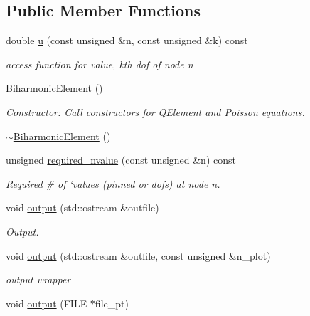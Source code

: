 \subsection*{Public Member Functions}
\begin{DoxyCompactItemize}
\item 
double \hyperlink{classoomph_1_1BiharmonicElement_ada3127693270368783121dfbef92d35d}{u} (const unsigned \&n, const unsigned \&k) const
\begin{DoxyCompactList}\small\item\em access function for value, kth dof of node n \end{DoxyCompactList}\item 
\hyperlink{classoomph_1_1BiharmonicElement_ae7ea696a05373fc4105a99bf4a8e49d7}{Biharmonic\+Element} ()
\begin{DoxyCompactList}\small\item\em Constructor\+: Call constructors for \hyperlink{classoomph_1_1QElement}{Q\+Element} and Poisson equations. \end{DoxyCompactList}\item 
\hyperlink{classoomph_1_1BiharmonicElement_afa00029c6b72aec12a6dbc4d888c9144}{$\sim$\+Biharmonic\+Element} ()
\item 
unsigned \hyperlink{classoomph_1_1BiharmonicElement_a11be94bc01db0e91409e5471693e8e0b}{required\+\_\+nvalue} (const unsigned \&n) const
\begin{DoxyCompactList}\small\item\em Required \# of `values\textquotesingle{} (pinned or dofs) at node n. \end{DoxyCompactList}\item 
void \hyperlink{classoomph_1_1BiharmonicElement_a03e56665ab48baab03924992830976c6}{output} (std\+::ostream \&outfile)
\begin{DoxyCompactList}\small\item\em Output. \end{DoxyCompactList}\item 
void \hyperlink{classoomph_1_1BiharmonicElement_ae21ebdb90932f2643157d2949093ea78}{output} (std\+::ostream \&outfile, const unsigned \&n\+\_\+plot)
\begin{DoxyCompactList}\small\item\em output wrapper \end{DoxyCompactList}\item 
void \hyperlink{classoomph_1_1BiharmonicElement_a405526be1bc18d1b758410767c1d1cae}{output} (F\+I\+LE $\ast$file\+\_\+pt)

\end{DoxyCompactItemize}
